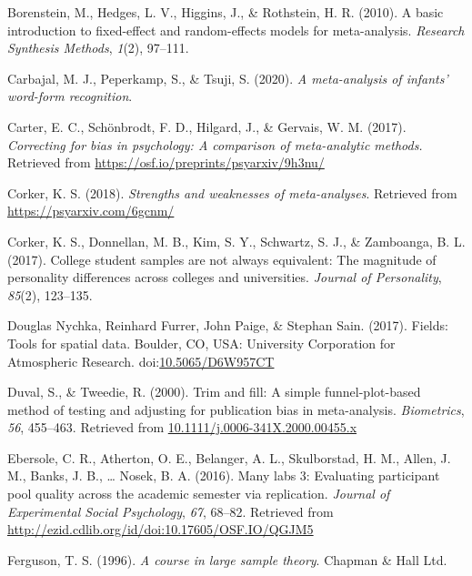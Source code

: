 \documentclass[english,,man]{apa6}
\begin{document}
\leavevmode\hypertarget{ref-Borenstein:etal:2010}{}%
Borenstein, M., Hedges, L. V., Higgins, J., \& Rothstein, H. R. (2010). A basic introduction to fixed-effect and random-effects models for meta-analysis. \emph{Research Synthesis Methods}, \emph{1}(2), 97--111.

\leavevmode\hypertarget{ref-Carbajal:etal:2020}{}%
Carbajal, M. J., Peperkamp, S., \& Tsuji, S. (2020). \emph{A meta-analysis of infants' word-form recognition}.

\leavevmode\hypertarget{ref-Carter:etal:2017}{}%
Carter, E. C., Schönbrodt, F. D., Hilgard, J., \& Gervais, W. M. (2017). \emph{Correcting for bias in psychology: A comparison of meta-analytic methods.} Retrieved from \url{https://osf.io/preprints/psyarxiv/9h3nu/}

\leavevmode\hypertarget{ref-Corker:2018}{}%
Corker, K. S. (2018). \emph{Strengths and weaknesses of meta-analyses}. Retrieved from \url{https://psyarxiv.com/6gcnm/}

\leavevmode\hypertarget{ref-Corker:etal:2017}{}%
Corker, K. S., Donnellan, M. B., Kim, S. Y., Schwartz, S. J., \& Zamboanga, B. L. (2017). College student samples are not always equivalent: The magnitude of personality differences across colleges and universities. \emph{Journal of Personality}, \emph{85}(2), 123--135.

\leavevmode\hypertarget{ref-R-fields}{}%
Douglas Nychka, Reinhard Furrer, John Paige, \& Stephan Sain. (2017). Fields: Tools for spatial data. Boulder, CO, USA: University Corporation for Atmospheric Research. doi:\href{https://doi.org/10.5065/D6W957CT}{10.5065/D6W957CT}

\leavevmode\hypertarget{ref-Duval:Tweedie:2000}{}%
Duval, S., \& Tweedie, R. (2000). Trim and fill: A simple funnel-plot-based method of testing and adjusting for publication bias in meta-analysis. \emph{Biometrics}, \emph{56}, 455--463. Retrieved from \url{10.1111/j.0006-341X.2000.00455.x}

\leavevmode\hypertarget{ref-Ebersole:etal:2016}{}%
Ebersole, C. R., Atherton, O. E., Belanger, A. L., Skulborstad, H. M., Allen, J. M., Banks, J. B., \ldots{} Nosek, B. A. (2016). Many labs 3: Evaluating participant pool quality across the academic semester via replication. \emph{Journal of Experimental Social Psychology}, \emph{67}, 68--82. Retrieved from \url{http://ezid.cdlib.org/id/doi:10.17605/OSF.IO/QGJM5}

\leavevmode\hypertarget{ref-Ferguson:1996}{}%
Ferguson, T. S. (1996). \emph{A course in large sample theory}. Chapman \& Hall Ltd.
\end{document}
